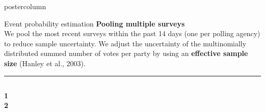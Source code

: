 \documentclass[final,hyperref={pdfpagelabels=false}]{beamer}
\newcommand{\bfBlue}[1]{\textcolor{koaladarkestblue}{\textbf{#1}}}
\newcommand{\darkgray}[1]{\textcolor{koaladarkgray}{#1}}
\begin{document}
\begin{frame}
\begin{columns}
\begin{column}{1\textwidth}
\begin{columns}[T]
\begin{column}{.484\textwidth}
\begin{beamercolorbox}[center,wd=\textwidth]{postercolumn}
\begin{minipage}[T]{.95\textwidth}
\begin{block}{\footnotesize Event probability estimation}
\bfBlue{Pooling multiple surveys} \\[0.5cm]
We pool the most recent surveys within the past 14 days (one per polling agency) to reduce
sample uncertainty. We adjust the uncertainty of the \darkgray{multinomially distributed}
summed number of votes per party by using an \darkgray{\textbf{effective sample size}} {\footnotesize (Hanley et al., 2003)}.
\\[0.05cm]
\textcolor{LMUlightgray}{\hrule{}}
\vspace{1ex}
\hspace*{-40px}
\begin{minipage}{\textwidth}
\begin{columns}[t]
  \begin{column}{.01\textwidth}
  \vspace{7px}
  \begin{minipage}{\textwidth}
  \bfBlue{1} \\
  \vspace{284px}
  \bfBlue{2}
  \end{minipage}
  \end{column}

  \hspace{-30px}
  \textcolor{LMUlightgray}{\vrule{}}
  \hspace{0px}


\end{columns}
\end{minipage}
\end{block}
\end{minipage}
\end{beamercolorbox}
\end{column}
\end{columns}
\end{column}
\end{columns}
\end{frame}
\end{document}
